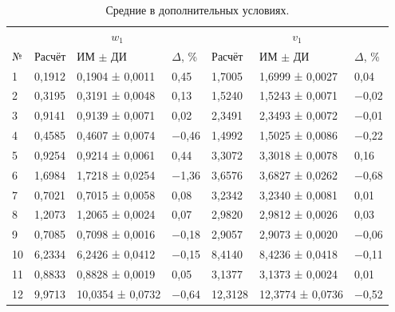 \documentclass[a4paper,12pt]{article}
\begin{document}
\begin{table}[!htbp]
\centering\small\setlength{\tabcolsep}{2pt}
\begin{tabular}{@{}p{1.5cm}p{1.9cm}p{3.4cm}p{1.4cm}p{1.9cm}p{3.4cm}p{1.4cm}@{}}
\toprule
 & \multicolumn{3}{c}{$w_1$} & \multicolumn{3}{c}{$v_1$} \\
№ & Расчёт & ИМ $\pm$ ДИ & $\Delta$, \% & Расчёт & ИМ $\pm$ ДИ & $\Delta$, \% \\
\midrule
1 & 0,1912 & 0,1904 ± 0,0011 & 0,45 & 1,7005 & 1,6999 ± 0,0027 & 0,04 \\
2 & 0,3195 & 0,3191 ± 0,0048 & 0,13 & 1,5240 & 1,5243 ± 0,0071 & −0,02 \\
3 & 0,9141 & 0,9139 ± 0,0071 & 0,02 & 2,3491 & 2,3493 ± 0,0072 & −0,01 \\
4 & 0,4585 & 0,4607 ± 0,0074 & −0,46 & 1,4992 & 1,5025 ± 0,0086 & −0,22 \\
5 & 0,9254 & 0,9214 ± 0,0061 & 0,44 & 3,3072 & 3,3018 ± 0,0078 & 0,16 \\
6 & 1,6984 & 1,7218 ± 0,0254 & −1,36 & 3,6576 & 3,6827 ± 0,0262 & −0,68 \\
7 & 0,7021 & 0,7015 ± 0,0058 & 0,08 & 3,2342 & 3,2340 ± 0,0081 & 0,01 \\
8 & 1,2073 & 1,2065 ± 0,0024 & 0,07 & 2,9820 & 2,9812 ± 0,0026 & 0,03 \\
9 & 0,7085 & 0,7098 ± 0,0016 & −0,18 & 2,9057 & 2,9073 ± 0,0020 & −0,06 \\
10 & 6,2334 & 6,2426 ± 0,0412 & −0,15 & 8,4140 & 8,4236 ± 0,0418 & −0,11 \\
11 & 0,8833 & 0,8828 ± 0,0019 & 0,05 & 3,1377 & 3,1373 ± 0,0024 & 0,01 \\
12 & 9,9713 & 10,0354 ± 0,0732 & −0,64 & 12,3128 & 12,3774 ± 0,0736 & −0,52 \\
\bottomrule
\end{tabular}
\caption{Средние в дополнительных условиях.}
\label{tab:studymeans}
\end{table}
\end{document}
